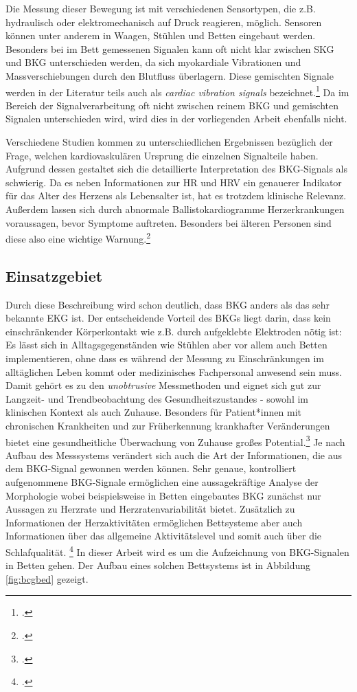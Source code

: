 	Die Messung dieser Bewegung ist mit verschiedenen Sensortypen, die z.B. hydraulisch oder elektromechanisch auf Druck reagieren, möglich. Sensoren können unter anderem in Waagen, Stühlen und Betten eingebaut werden. Besonders bei im Bett gemessenen Signalen kann oft nicht klar zwischen \ac{SKG} und \ac{BKG} unterschieden werden, da sich myokardiale Vibrationen und Massverschiebungen durch den Blutfluss überlagern. Diese gemischten Signale werden in der Literatur teils auch als \textit{cardiac vibration signals} bezeichnet.\footcite[Vgl.][]{Bruser2013} Da im Bereich der Signalverarbeitung oft nicht zwischen reinem \ac{BKG} und gemischten Signalen unterschieden wird, wird dies in der vorliegenden Arbeit ebenfalls nicht.
	
	Verschiedene Studien kommen zu unterschiedlichen Ergebnissen bezüglich der Frage, welchen kardiovaskulären Ursprung die einzelnen Signalteile haben. Aufgrund dessen gestaltet sich die detaillierte Interpretation des \ac{BKG}-Signals als schwierig. Da es neben Informationen zur \ac{HR} und \ac{HRV} ein genauerer Indikator für das Alter des Herzens als Lebensalter ist, hat es trotzdem klinische Relevanz. Außerdem lassen sich durch abnormale Ballistokardiogramme Herzerkrankungen voraussagen, bevor Symptome auftreten. Besonders bei älteren Personen sind diese also eine wichtige Warnung.\footcite[Vgl. zu diesem Absatz][]{Pinheiro2010}
	
	\subsection{Einsatzgebiet}
	
	Durch diese Beschreibung wird schon deutlich, dass \ac{BKG} anders als das sehr bekannte \ac{EKG} ist. Der entscheidende Vorteil des \ac{BKG}s liegt darin, dass kein einschränkender Körperkontakt wie z.B. durch aufgeklebte Elektroden nötig ist: Es lässt sich in Alltagsgegenständen wie Stühlen aber vor allem auch Betten implementieren, ohne dass es während der Messung zu Einschränkungen im alltäglichen Leben kommt oder medizinisches Fachpersonal anwesend sein muss. Damit gehört es zu den \textit{unobtrusive} Messmethoden und eignet sich gut zur Langzeit- und Trendbeobachtung des Gesundheitszustandes - sowohl im klinischen Kontext als auch Zuhause. Besonders für Patient*innen mit chronischen Krankheiten und zur Früherkennung krankhafter Veränderungen bietet eine gesundheitliche Überwachung von Zuhause großes Potential.\footcite[Vgl.][]{Inan2015} Je nach Aufbau des Messsystems verändert sich auch die Art der Informationen, die aus dem \ac{BKG}-Signal gewonnen werden können. Sehr genaue, kontrolliert aufgenommene \ac{BKG}-Signale ermöglichen eine aussagekräftige Analyse der Morphologie wobei beispielsweise in Betten eingebautes \ac{BKG} zunächst nur Aussagen zu Herzrate und Herzratenvariabilität bietet. Zusätzlich zu Informationen der Herzaktivitäten ermöglichen Bettsysteme aber auch Informationen über das allgemeine Aktivitätslevel und somit auch über die Schlafqualität. \footcite[Vgl.][]{Bruser2011} In dieser Arbeit wird es um die Aufzeichnung von \ac{BKG}-Signalen in Betten gehen. Der Aufbau eines solchen Bettsystems ist in Abbildung \ref{fig:bcgbed} gezeigt.
	
